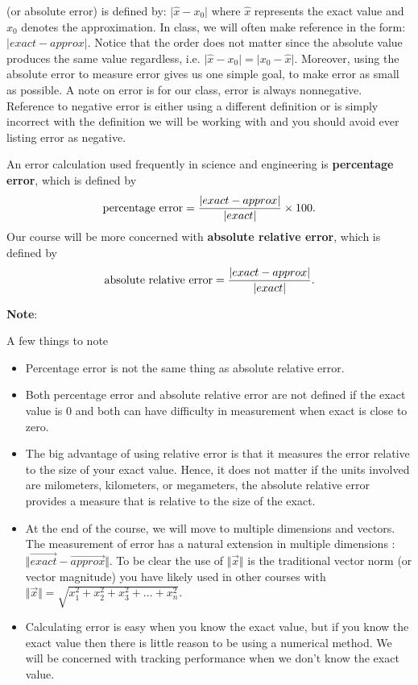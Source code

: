 \documentclass[twoside]{article}
\def\ds{\displaystyle}
\begin{document}
 (or absolute error) is defined by: $\vert \hat x - x_0 \vert$ where $\ds \hat x$ represents the exact value and $\ds x_0$ denotes the approximation. In class, we will often make reference in the form: $\ds \vert exact - approx \vert$. Notice that the order does not matter since the absolute value produces the same value regardless,  i.e. $\ds \vert \hat x - x_0 \vert = \vert x_0 - \hat x \vert $. Moreover, using the absolute error to measure error gives us one simple goal, to make error as small as possible.\label{d:error} {\color{teal} A note on error is for our class, error is always nonnegative. Reference to negative error is either using a different definition or is simply incorrect with the definition we will be working with and you should avoid ever listing error as negative.} 

An error calculation used frequently in science and engineering is {\bf percentage error}, which is defined by
$${\rm percentage \ error} = \frac {\vert exact - approx \vert}{\vert exact \vert} \times 100.$$
Our course will be more concerned with {\bf absolute relative error}, which is defined by
$${\rm absolute \ relative \ error} = \frac {\vert exact - approx\vert}{\vert exact \vert}.$$

{\bf Note}: {\color{teal} A few things to note
\begin{itemize}
\item Percentage error is not the same thing as absolute relative error.
\item Both percentage error and absolute relative error are not defined if the exact value is 0 and both can have difficulty in measurement when exact is close to zero.
\item The big advantage of using relative error is that it measures the error relative to the size of your exact value. Hence, it does not matter if the units involved are milometers, kilometers, or megameters, the absolute relative error provides a measure that is relative to the size of the exact. 
\item At the end of the course, we will move to multiple dimensions and vectors. The measurement of error has a natural extension in multiple dimensions : $\ds \Vert \vec {exact} - \vec {approx} \Vert$. To be clear the use of $\ds \Vert \vec x \Vert$ is the traditional vector norm (or vector magnitude) you have likely used in other courses with $\ds \Vert \vec x \Vert = \sqrt{x_1^2 + x_2^2 + x_3^2+...+x_n^2}$. 
\item Calculating error is easy when you know the exact value, but if you know the exact value then there is little reason to be using a numerical method. We will be concerned with tracking performance when we don't know the exact value. 
\end{itemize}}
\end{document}
